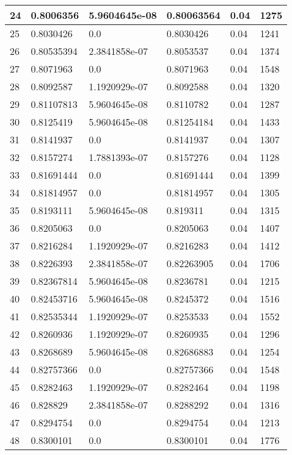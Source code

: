 \begin{longtable}{|l|l|l|l|l|l|}
24 & 0.8006356 & 5.9604645e-08 & 0.80063564 & 0.04 & 1275 \\ \hline 
25 & 0.8030426 & 0.0 & 0.8030426 & 0.04 & 1241 \\ \hline 
26 & 0.80535394 & 2.3841858e-07 & 0.8053537 & 0.04 & 1374 \\ \hline 
27 & 0.8071963 & 0.0 & 0.8071963 & 0.04 & 1548 \\ \hline 
28 & 0.8092587 & 1.1920929e-07 & 0.8092588 & 0.04 & 1320 \\ \hline 
29 & 0.81107813 & 5.9604645e-08 & 0.8110782 & 0.04 & 1287 \\ \hline 
30 & 0.8125419 & 5.9604645e-08 & 0.81254184 & 0.04 & 1433 \\ \hline 
31 & 0.8141937 & 0.0 & 0.8141937 & 0.04 & 1307 \\ \hline 
32 & 0.8157274 & 1.7881393e-07 & 0.8157276 & 0.04 & 1128 \\ \hline 
33 & 0.81691444 & 0.0 & 0.81691444 & 0.04 & 1399 \\ \hline 
34 & 0.81814957 & 0.0 & 0.81814957 & 0.04 & 1305 \\ \hline 
35 & 0.8193111 & 5.9604645e-08 & 0.819311 & 0.04 & 1315 \\ \hline 
36 & 0.8205063 & 0.0 & 0.8205063 & 0.04 & 1407 \\ \hline 
37 & 0.8216284 & 1.1920929e-07 & 0.8216283 & 0.04 & 1412 \\ \hline 
38 & 0.8226393 & 2.3841858e-07 & 0.82263905 & 0.04 & 1706 \\ \hline 
39 & 0.82367814 & 5.9604645e-08 & 0.8236781 & 0.04 & 1215 \\ \hline 
40 & 0.82453716 & 5.9604645e-08 & 0.8245372 & 0.04 & 1516 \\ \hline 
41 & 0.82535344 & 1.1920929e-07 & 0.8253533 & 0.04 & 1552 \\ \hline 
42 & 0.8260936 & 1.1920929e-07 & 0.8260935 & 0.04 & 1296 \\ \hline 
43 & 0.8268689 & 5.9604645e-08 & 0.82686883 & 0.04 & 1254 \\ \hline 
44 & 0.82757366 & 0.0 & 0.82757366 & 0.04 & 1548 \\ \hline 
45 & 0.8282463 & 1.1920929e-07 & 0.8282464 & 0.04 & 1198 \\ \hline 
46 & 0.828829 & 2.3841858e-07 & 0.8288292 & 0.04 & 1316 \\ \hline 
47 & 0.8294754 & 0.0 & 0.8294754 & 0.04 & 1213 \\ \hline 
48 & 0.8300101 & 0.0 & 0.8300101 & 0.04 & 1776 \\ \hline 

\end{longtable}
